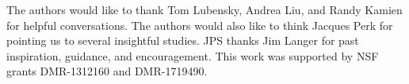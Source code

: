 \documentclass[
  aps,
  pre,
  reprint,
  longbibliography,
  floatfix
]{revtex4-2}
\begin{document}
\begin{acknowledgments}
  The authors would like to thank Tom Lubensky, Andrea Liu, and Randy Kamien
  for helpful conversations. The authors would also like to think Jacques Perk
  for pointing us to several insightful studies. JPS thanks Jim Langer for past
  inspiration, guidance, and encouragement. This work was supported by NSF
  grants DMR-1312160 and DMR-1719490.
\end{acknowledgments}


\end{document}

